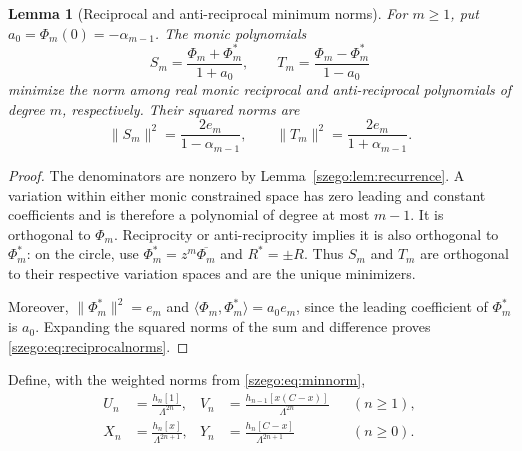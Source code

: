 \documentclass[11pt,a4paper]{article}
\numberwithin{equation}{section}
\newtheorem{lemma}[theorem]{Lemma}
\theoremstyle{remark}\newtheorem{remark}[theorem]{Remark}
\newcommand{\Lam}{\Lambda}
\newcommand{\norm}[1]{\lVert#1\rVert}
\begin{document}
\begin{lemma}[Reciprocal and anti-reciprocal minimum norms]\label{szego:lem:reciprocal}
For $m\geq1$, put $a_0=\Phi_m(0)=-\alpha_{m-1}$. The monic polynomials
\[
 S_m=\frac{\Phi_m+\Phi_m^*}{1+a_0},\qquad
 T_m=\frac{\Phi_m-\Phi_m^*}{1-a_0}
\]
minimize the norm among real monic reciprocal and anti-reciprocal
polynomials of degree $m$, respectively. Their squared norms are
\begin{equation}\label{szego:eq:reciprocalnorms}
 \norm{S_m}^2=\frac{2e_m}{1-\alpha_{m-1}},\qquad
 \norm{T_m}^2=\frac{2e_m}{1+\alpha_{m-1}}.
\end{equation}
\end{lemma}
\begin{proof}
The denominators are nonzero by Lemma~\ref{szego:lem:recurrence}.
A variation within either monic constrained space has zero leading and
constant coefficients and is therefore a polynomial of degree at most $m-1$.
It is orthogonal to $\Phi_m$. Reciprocity or anti-reciprocity implies it
is also orthogonal to $\Phi_m^*$: on the circle, use
$\Phi_m^*=z^m\overline{\Phi_m}$ and $R^*=\pm R$.
Thus $S_m$ and $T_m$ are orthogonal to their respective variation spaces
and are the unique minimizers.

Moreover, $\norm{\Phi_m^*}^2=e_m$ and
$\langle\Phi_m,\Phi_m^*\rangle=a_0e_m$, since the leading coefficient of
$\Phi_m^*$ is $a_0$. Expanding the squared norms of the sum and difference
proves \eqref{szego:eq:reciprocalnorms}.
\end{proof}

Define, with the weighted norms from \eqref{szego:eq:minnorm},
\begin{align}
 U_n&=\frac{h_n[1]}{\Lam^{2n}},
 &V_n&=\frac{h_{n-1}[x(C-x)]}{\Lam^{2n}} &&(n\geq1),\label{szego:eq:UV}\\
 X_n&=\frac{h_n[x]}{\Lam^{2n+1}},
 &Y_n&=\frac{h_n[C-x]}{\Lam^{2n+1}} &&(n\geq0).\label{szego:eq:XY}
\end{align}
\end{document}

